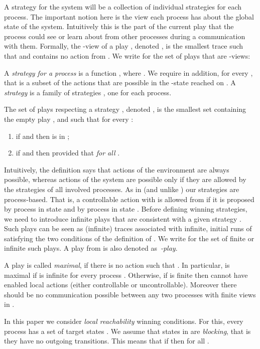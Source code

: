 \documentclass{llncs}
\begin{document}
A strategy for the system will be a collection of individual
strategies for each process. The important notion here is the view 
each process has about the global state of the system. Intuitively this is
the part of the current play that the process could see or  learn
about from other processes during a communication with them. Formally,
the -view of a play , denoted , is the smallest
trace  such that  and  contains no action from
. We write  for the set of plays that are
-views:


A \emph{strategy for a process}  is a function
, where .  We require in addition, for every , that  is a subset of the actions that are
possible in the -state reached on . A \emph{strategy} is a
family of strategies , one for each process.

The set of plays respecting a strategy , denoted ,  is the smallest set  
containing the empty play , and such that for every :
\begin{enumerate}
\item if  and  then  is in
  ;
\item if  and  then  provided that  \emph{for all}
  .
\end{enumerate}
Intuitively, the definition says that actions of the environment are
always possible, whereas actions of the system are possible only if
they are allowed by the strategies of all involved processes.
As in \cite{MTY05} (and unlike \cite{GLZ04}) our strategies
are process-based. That is, a controllable action  with
 is allowed from  if it is proposed by
process  in state  and by process  in state .
Before
defining winning strategies, we need to introduce infinite plays that
are consistent with a given strategy . Such plays can be seen as
(infinite) traces associated with infinite, initial runs of 
satisfying the two conditions of the definition of
. We write  for the set of
finite or infinite such plays.  A play from  is
also denoted as~\emph{-play}.


A play  is called
\emph{maximal}, if there is no action  such that
.  In particular,  is maximal if
 is infinite for every process . Otherwise, if
 is finite then  cannot have enabled local actions
(either controllable or uncontrollable). Moreover there should be no
communication possible between any two processes with finite views in
.


In this paper we consider \emph{local reachability} winning
conditions. For this, every process has a set of target states . We assume that states in  are \emph{blocking},
that is they have no outgoing transitions. This means that if
 then  for all . 
\end{document}
